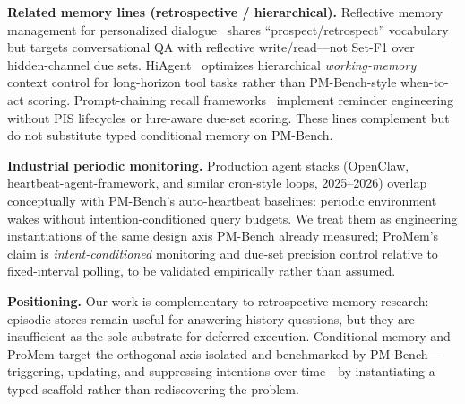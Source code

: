 \noindent\textbf{Related memory lines (retrospective / hierarchical).}
Reflective memory management for personalized dialogue~\cite{inprospect2025} shares ``prospect/retrospect'' vocabulary but targets conversational QA with reflective write/read---not Set-F1 over hidden-channel due sets. HiAgent~\cite{hiagent2025} optimizes hierarchical \emph{working-memory} context control for long-horizon tool tasks rather than PM-Bench-style when-to-act scoring. Prompt-chaining recall frameworks~\cite{promptchain2025} implement reminder engineering without PIS lifecycles or lure-aware due-set scoring. These lines complement but do not substitute typed conditional memory on PM-Bench.

\noindent\textbf{Industrial periodic monitoring.}
Production agent stacks (OpenClaw, heartbeat-agent-framework, and similar cron-style loops, 2025--2026) overlap conceptually with PM-Bench's auto-heartbeat baselines: periodic environment wakes without intention-conditioned query budgets. We treat them as engineering instantiations of the same design axis PM-Bench already measured; ProMem's claim is \emph{intent-conditioned} monitoring and due-set precision control relative to fixed-interval polling, to be validated empirically rather than assumed.

\noindent\textbf{Positioning.}
Our work is complementary to retrospective memory research: episodic stores remain useful for answering history questions, but they are insufficient as the sole substrate for deferred execution. Conditional memory and ProMem target the orthogonal axis isolated and benchmarked by PM-Bench---triggering, updating, and suppressing intentions over time---by instantiating a typed scaffold rather than rediscovering the problem.
